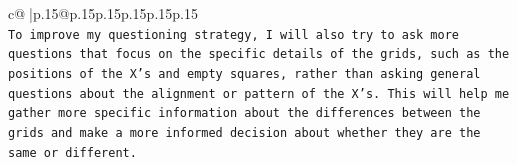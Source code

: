 \documentclass{article}
\begin{document}
{\begin{supertabular}{c@{$\;$}|p{.15\linewidth}@{}p{.15\linewidth}p{.15\linewidth}p{.15\linewidth}p{.15\linewidth}p{.15\linewidth}}
{{{\\ 
\texttt{To improve my questioning strategy, I will also try to ask more questions that focus on the specific details of the grids, such as the positions of the X's and empty squares, rather than asking general questions about the alignment or pattern of the X's. This will help me gather more specific information about the differences between the grids and make a more informed decision about whether they are the same or different.} \\
            }
        }
    }
     \\ \\

\end{supertabular}
}
\end{document}
